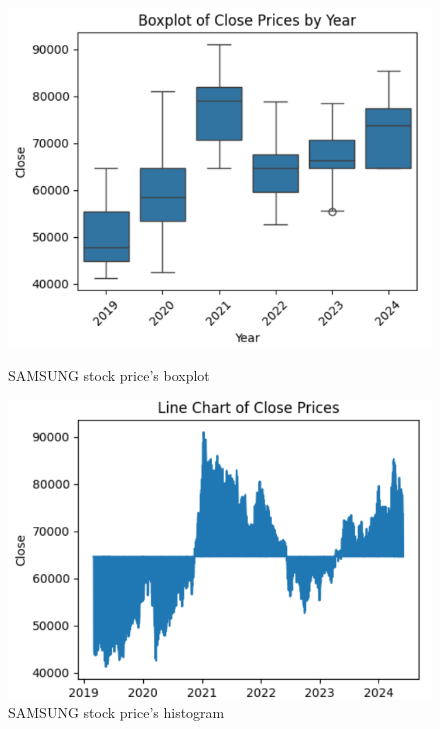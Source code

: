 \documentclass{article}
\begin{document}
\begin{multicols}{2}
\begin{figure}[H]
    \centering
    \begin{minipage}{0.23\textwidth}
    \centering
    \includegraphics[width=1\textwidth]{Image/DatasetImg/SAMSUNG_Boxplot.png}
    \caption{SAMSUNG stock price's boxplot}
    \label{fig:1}
    \end{minipage}
    \hfill
    \begin{minipage}{0.23\textwidth}
    \centering
    \includegraphics[width=1\textwidth]{Image/DatasetImg/SAMSUNG_LineChart.png}
    \caption{SAMSUNG stock price's histogram}
    \label{fig:2}
    \end{minipage}
\end{figure}


\end{multicols}
\end{document}
